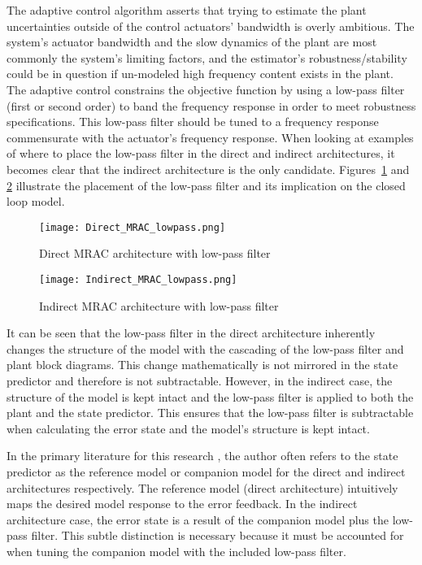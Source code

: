 The \Lone adaptive control algorithm asserts that trying to estimate the plant uncertainties outside of the control actuators' bandwidth is overly ambitious.  The system's actuator bandwidth and the slow dynamics of the plant are most commonly the system's limiting factors, and the estimator's robustness/stability could be in question if un-modeled high frequency content exists in the plant.  %
The \Lone adaptive control constrains the objective function by using a low-pass filter (first or second order) to band the frequency response in order to meet robustness specifications.  This low-pass filter should be tuned to a frequency response commensurate with the actuator's frequency response.  When looking at examples of where to place the low-pass filter in the direct and indirect architectures, it becomes clear that the indirect architecture is the only candidate.  Figures~\ref{fig:direct_mrac_lowpass} and \ref{fig:indirect_mrac_lowpass} illustrate the placement of the low-pass filter and its implication on the closed loop model. 

\begin{figure}[h!]
 \centering
  \texttt{[image: Direct\_MRAC\_lowpass.png]}
  \caption{Direct \ac{MRAC} architecture with low-pass filter }
  \label{fig:direct_mrac_lowpass}
\end{figure}

\begin{figure}[h!]
 \centering
  \texttt{[image: Indirect\_MRAC\_lowpass.png]}
  \caption{Indirect \ac{MRAC} architecture with low-pass filter }
  \label{fig:indirect_mrac_lowpass}
\end{figure}

 It can be seen that the low-pass filter in the direct architecture inherently changes the structure of the model with the cascading of the low-pass filter and plant block diagrams.  This change mathematically is not mirrored in the state predictor and therefore is not subtractable.  However, in the indirect case, the structure of the model is kept intact and the low-pass filter is applied to both the plant and the state predictor.  This ensures that the low-pass filter is subtractable when calculating the error state and the model's structure is kept intact.

In the primary literature for this research \cite{hovakimyan2010l1}, the author often refers to the state predictor as the reference model or companion model for the direct and indirect architectures respectively.  The reference model (direct architecture) intuitively maps the desired model response to the error feedback.  In the indirect architecture case, the error state is a result of the companion model plus the low-pass filter.  This subtle distinction is necessary because it must be accounted for when tuning the companion model with the included low-pass filter.

